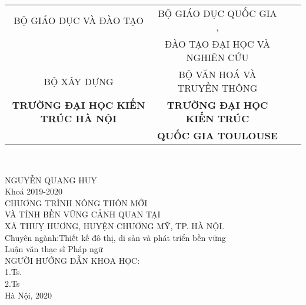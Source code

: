 \documentclass[../thesis.tex]{subfiles}
\begin{document}
\begin{titlepage}

\begin{center}
\begin{table}
\small
\centering
\begin{tabular}{c c r l}
BỘ GIÁO DỤC VÀ ĐÀO TẠO  &  BỘ GIÁO DỤC QUỐC GIA ,\\
 & ĐÀO TẠO ĐẠI HỌC VÀ NGHIÊN CỨU\\ 
BỘ XÂY DỰNG & BỘ VĂN HOÁ VÀ TRUYỀN THÔNG\\
\textbf{TRƯỜNG ĐẠI HỌC KIẾN TRÚC HÀ NỘI} & \textbf{TRƯỜNG ĐẠI HỌC KIẾN TRÚC}\\
& \textbf{QUỐC GIA TOULOUSE}
\end{tabular}
\\[1cm]
\end{table}

\normalsize NGUYỄN QUANG HUY\\[1cm]
Khoá 2019-2020\\[1cm]


\large CHƯƠNG TRÌNH NÔNG THÔN MỚI\\ VÀ TÍNH BỀN VỮNG CẢNH QUAN TẠI\\ XÃ THUỴ HƯƠNG, HUYỆN CHƯƠNG MỸ, TP. HÀ NỘI.\\[2cm]

\normalsize Chuyên ngành:Thiết kế đô thị, di sản và phát triển bền vững\\
Luận văn thạc sĩ Pháp ngữ\\[2cm]

NGƯỜI HƯỚNG DẪN KHOA HỌC:\\[1cm]
1.Ts.\\
2.Ts\\[3cm]


Hà Nội, 2020

\end{center}

\end{titlepage}
\end{document}
